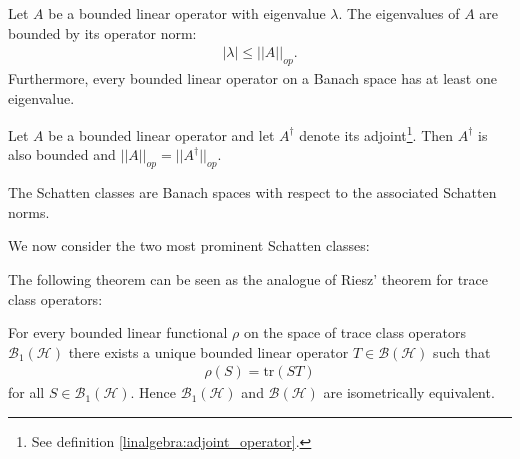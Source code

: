     \begin{property}
        Let $A$ be a bounded linear operator with eigenvalue $\lambda$. The eigenvalues of $A$ are bounded by its operator norm:
        \begin{gather}
            |\lambda|\leq||A||_{op}.
        \end{gather}
        Furthermore, every bounded linear operator on a Banach space has at least one eigenvalue.
    \end{property}
    \begin{property}
        Let $A$ be a bounded linear operator and let $A^\dag$ denote its adjoint\footnote{See definition \ref{linalgebra:adjoint_operator}.}. Then $A^\dag$ is also bounded and $||A||_{op} = ||A^\dag||_{op}$.
    \end{property}

    \begin{property}
        The Schatten classes are Banach spaces with respect to the associated Schatten norms.
    \end{property}

    We now consider the two most prominent Schatten classes:

    The following theorem can be seen as the analogue of Riesz' theorem for trace class operators:
    \begin{theorem}
        For every bounded linear functional $\rho$ on the space of trace class operators $\mathcal{B}_1(\mathcal{H})$ there exists a unique bounded linear operator $T\in\mathcal{B}(\mathcal{H})$ such that
        \begin{gather}
            \rho(S) = \text{tr}(ST)
        \end{gather}
        for all $S\in\mathcal{B}_1(\mathcal{H})$. Hence $\mathcal{B}_1(\mathcal{H})$ and $\mathcal{B}(\mathcal{H})$ are isometrically equivalent.
    \end{theorem}

